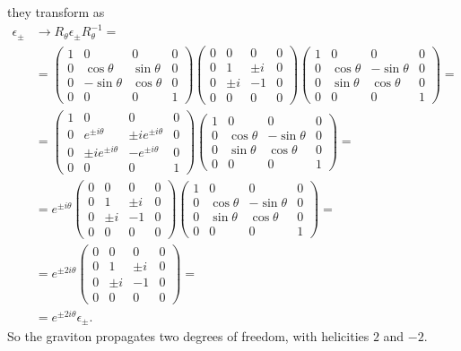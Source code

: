 \documentclass[a4paper,12pt]{book}
\begin{document}
they transform as
\begin{align*}
\epsilon_\pm&\to R_\theta\epsilon_\pm R^{-1}_\theta=\\
&=
\begin{pmatrix}
1 & 0 & 0 & 0\\
0 & \cos\theta & \sin\theta & 0\\
0 & -\sin\theta & \cos\theta & 0\\
0 & 0 & 0 & 1
\end{pmatrix}
\begin{pmatrix}
0 & 0 & 0 & 0\\
0 & 1 & \pm i & 0\\
0 & \pm i & -1 & 0\\
0 & 0 & 0 & 0
\end{pmatrix}
\begin{pmatrix}
1 & 0 & 0 & 0\\
0 & \cos\theta & -\sin\theta & 0\\
0 & \sin\theta & \cos\theta & 0\\
0 & 0 & 0 & 1
\end{pmatrix}=\\
&=
\begin{pmatrix}
1 & 0 & 0 & 0\\
0 & e^{\pm i\theta} & \pm ie^{\pm i\theta} & 0\\
0 & \pm ie^{\pm i\theta} & -e^{\pm i\theta} & 0\\
0 & 0 & 0 & 1
\end{pmatrix}
\begin{pmatrix}
1 & 0 & 0 & 0\\
0 & \cos\theta & -\sin\theta & 0\\
0 & \sin\theta & \cos\theta & 0\\
0 & 0 & 0 & 1
\end{pmatrix}=\\
&=e^{\pm i\theta}
\begin{pmatrix}
0 & 0 & 0 & 0\\
0 & 1 & \pm i & 0\\
0 & \pm i & -1 & 0\\
0 & 0 & 0 & 0
\end{pmatrix}
\begin{pmatrix}
1 & 0 & 0 & 0\\
0 & \cos\theta & -\sin\theta & 0\\
0 & \sin\theta & \cos\theta & 0\\
0 & 0 & 0 & 1
\end{pmatrix}=\\
&=e^{\pm 2i\theta}
\begin{pmatrix}
0 & 0 & 0 & 0\\
0 & 1 & \pm i & 0\\
0 & \pm i & -1 & 0\\
0 & 0 & 0 & 0
\end{pmatrix}=\\
&=e^{\pm 2i\theta}\epsilon_\pm.
\end{align*}
So the graviton propagates two degrees of freedom, with helicities $2$ and $-2$.
\end{document}

